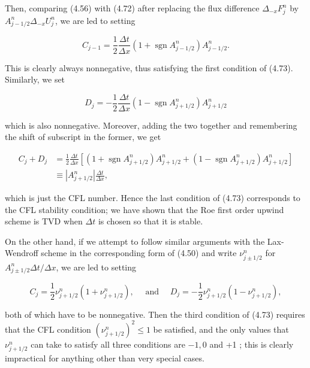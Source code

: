 \documentclass[10pt]{article}
\begin{document}
Then, comparing (4.56) with (4.72) after replacing the flux difference \(\Delta_{-x} F_{j}^{n}\) by \(A_{j-1 / 2}^{n} \Delta_{-x} U_{j}^{n}\), we are led to setting

\[
C_{j-1}=\frac{1}{2} \frac{\Delta t}{\Delta x}\left(1+\operatorname{sgn} A_{j-1 / 2}^{n}\right) A_{j-1 / 2}^{n} .
\]

This is clearly always nonnegative, thus satisfying the first condition of (4.73). Similarly, we set

\[
D_{j}=-\frac{1}{2} \frac{\Delta t}{\Delta x}\left(1-\operatorname{sgn} A_{j+1 / 2}^{n}\right) A_{j+1 / 2}^{n}
\]

which is also nonnegative. Moreover, adding the two together and remembering the shift of subscript in the former, we get

\[
\begin{aligned}
C_{j}+D_{j} & =\frac{1}{2} \frac{\Delta t}{\Delta x}\left[\left(1+\operatorname{sgn} A_{j+1 / 2}^{n}\right) A_{j+1 / 2}^{n}+\left(1-\operatorname{sgn} A_{j+1 / 2}^{n}\right) A_{j+1 / 2}^{n}\right] \\
& \equiv\left|A_{j+1 / 2}^{n}\right| \frac{\Delta t}{\Delta x},
\end{aligned}
\]

which is just the CFL number. Hence the last condition of (4.73) corresponds to the CFL stability condition; we have shown that the Roe first order upwind scheme is TVD when \(\Delta t\) is chosen so that it is stable.

On the other hand, if we attempt to follow similar arguments with the Lax-Wendroff scheme in the corresponding form of (4.50) and write \(\nu_{j \pm 1 / 2}^{n}\) for \(A_{j \pm 1 / 2}^{n} \Delta t / \Delta x\), we are led to setting

\[
C_{j}=\frac{1}{2} \nu_{j+1 / 2}^{n}\left(1+\nu_{j+1 / 2}^{n}\right), \quad \text { and } \quad D_{j}=-\frac{1}{2} \nu_{j+1 / 2}^{n}\left(1-\nu_{j+1 / 2}^{n}\right),
\]

both of which have to be nonnegative. Then the third condition of (4.73) requires that the CFL condition \(\left(\nu_{j+1 / 2}^{n}\right)^{2} \leq 1\) be satisfied, and the only values that \(\nu_{j+1 / 2}^{n}\) can take to satisfy all three conditions are \(-1,0\) and +1 ; this is clearly impractical for anything other than very special cases.
\end{document}
